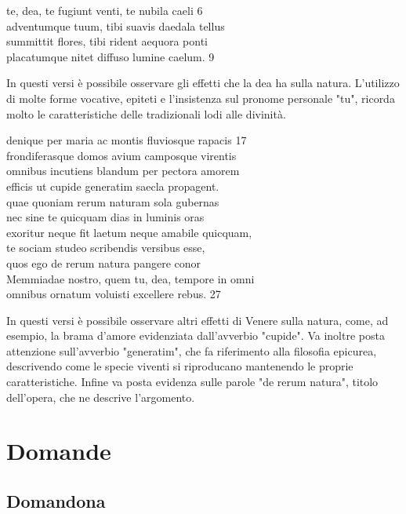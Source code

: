 \documentclass[10pt,a4paper]{article}
\begin{document}
	\begin{estratto}
		te, dea, te fugiunt venti, te nubila caeli 6\\
		adventumque tuum, tibi suavis daedala tellus \\
		summittit flores, tibi rident aequora ponti \\
		placatumque nitet diffuso lumine caelum. 9
	\end{estratto}

	In questi versi è possibile osservare gli effetti che la dea ha sulla natura. L'utilizzo di molte forme vocative, epiteti e l'insistenza sul pronome personale "tu", ricorda molto le caratteristiche delle tradizionali lodi alle divinità.
	
	\begin{estratto}
		denique per maria ac montis fluviosque rapacis 17  \\
		frondiferasque domos avium camposque virentis \\
		omnibus incutiens blandum per pectora amorem \\
		efficis ut cupide generatim saecla propagent. \\           
		quae quoniam rerum naturam sola gubernas \\
		nec sine te quicquam dias in luminis oras \\
		exoritur neque fit laetum neque amabile quicquam, \\
		te sociam studeo scribendis versibus esse, \\
		quos ego de rerum natura pangere conor \\        
		Memmiadae nostro, quem tu, dea, tempore in omni \\
		omnibus ornatum voluisti excellere rebus.	27
	\end{estratto}

	In questi versi è possibile osservare altri effetti di Venere sulla natura, come, ad esempio, la brama d'amore evidenziata dall'avverbio "cupide". Va inoltre posta attenzione sull'avverbio "generatim", che fa riferimento alla filosofia epicurea, descrivendo come le specie viventi si riproducano mantenendo le proprie caratteristiche. Infine va posta evidenza sulle parole "de rerum natura", titolo dell'opera, che ne descrive l'argomento.
	
	\section{Domande}
	
	\subsection{Domandona}
	
\end{document}

